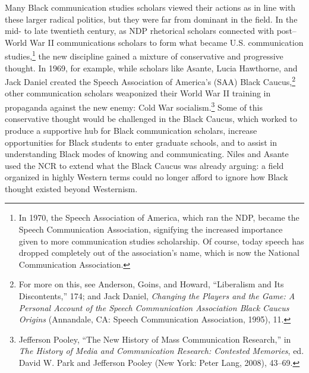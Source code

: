 \documentclass{tufte-handout}
\begin{document}
Many Black communication studies scholars viewed their actions as in
line with these larger radical politics, but they were far from dominant
in the field. In the mid- to late twentieth century, as NDP rhetorical
scholars connected with post--World War II communications scholars to
form what became U.S. communication
studies,\footnote{In 1970, the Speech Association of America, which ran the NDP, became
  the Speech Communication Association, signifying the increased
  importance given to more communication studies scholarship. Of course,
  today speech has dropped completely out of the association's name,
  which is now the National Communication Association.
} the new discipline gained
a mixture of conservative and progressive thought. In 1969, for example,
while scholars like Asante, Lucia Hawthorne, and Jack Daniel created the
Speech Association of America's (SAA) Black
Caucus,\footnote{For more on this, see Anderson, Goins, and Howard, ``Liberalism and
  Its Discontents,'' 174; and Jack Daniel, \emph{Changing the Players
  and the Game: A Personal Account of the Speech Communication
  Association Black Caucus Origins} (Annandale, CA: Speech Communication
  Association, 1995), 11.
} other communication
scholars weaponized their World War II training in propaganda against
the new enemy: Cold War
socialism.\footnote{Jefferson Pooley, ``The New History of Mass Communication Research,''
  in \emph{The History of Media and Communication Research: Contested
  Memories}, ed. David W. Park and Jefferson Pooley (New York: Peter
  Lang, 2008), 43--69.
} Some of this
conservative thought would be challenged in the Black Caucus, which
worked to produce a supportive hub for Black communication scholars,
increase opportunities for Black students to enter graduate schools, and
to assist in understanding Black modes of knowing and communicating.
Niles and Asante used the NCR to extend what the Black Caucus was
already arguing: a field organized in highly Western terms could no
longer afford to ignore how Black thought existed beyond Westernism.
\end{document}
